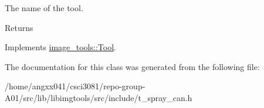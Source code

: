 The name of the tool. 

\begin{DoxyReturn}{Returns}

\end{DoxyReturn}


Implements \hyperlink{classimage__tools_1_1Tool_a251c179e3ac9756d08fbcd082750f8a9}{image\+\_\+tools\+::\+Tool}.



The documentation for this class was generated from the following file\+:\begin{DoxyCompactItemize}
\item 
/home/angxx041/csci3081/repo-\/group-\/\+A01/src/lib/libimgtools/src/include/t\+\_\+spray\+\_\+can.\+h\end{DoxyCompactItemize}
